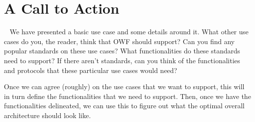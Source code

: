 
\section{A Call to Action}~\label{sec:action}
We have presented a basic use case and some details around it.  What other use cases do you, the reader, think that OWF should support?  Can you find any popular standards on these use cases?  What functionalities do these standards need to support?  If there aren't standards, can you think of the functionalities and protocols that these particular use cases would need?

Once we can agree (roughly) on the use cases that we want to support, this will in turn define the functionalities that we need to support.  Then, once we have the functionalities delineated, we can use this to figure out what the optimal overall architecture should look like.

